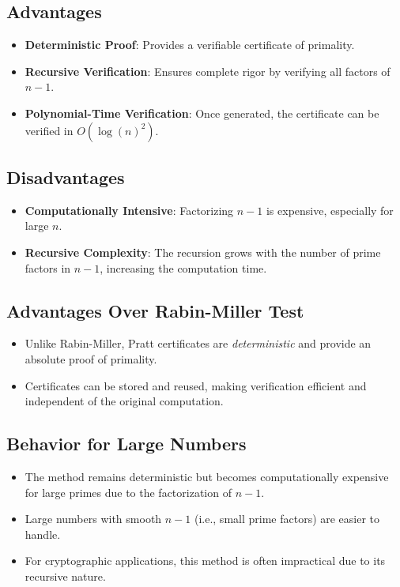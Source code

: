 \documentclass[12pt]{article}
\begin{document}
\subsection*{Advantages}

\begin{itemize}
    \item \textbf{Deterministic Proof}: Provides a verifiable certificate of primality.
    \item \textbf{Recursive Verification}: Ensures complete rigor by verifying all factors of \( n-1 \).
    \item \textbf{Polynomial-Time Verification}: Once generated, the certificate can be verified in \( O(\log(n)^2) \).
\end{itemize}

\subsection*{Disadvantages}

\begin{itemize}
    \item \textbf{Computationally Intensive}: Factorizing \( n-1 \) is expensive, especially for large \( n \).
    \item \textbf{Recursive Complexity}: The recursion grows with the number of prime factors in \( n-1 \), increasing the computation time.
\end{itemize}

\subsection*{Advantages Over Rabin-Miller Test}

\begin{itemize}
    \item Unlike Rabin-Miller, Pratt certificates are \emph{deterministic} and provide an absolute proof of primality.
    \item Certificates can be stored and reused, making verification efficient and independent of the original computation.
\end{itemize}

\subsection*{Behavior for Large Numbers}

\begin{itemize}
    \item The method remains deterministic but becomes computationally expensive for large primes due to the factorization of \( n-1 \).
    \item Large numbers with smooth \( n-1 \) (i.e., small prime factors) are easier to handle.
    \item For cryptographic applications, this method is often impractical due to its recursive nature.
\end{itemize}
\end{document}
